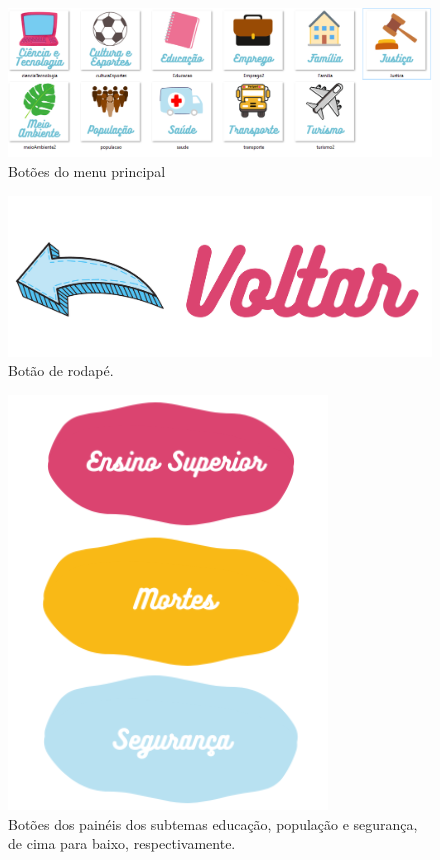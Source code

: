 \documentclass[
]{book}
\begin{document}
\begin{figure}
\includegraphics[width=1.5\linewidth]{images/image80} \caption{Botões do menu principal}\label{fig:botaotrecossa}
\end{figure}

\begin{figure}
\includegraphics[width=0.5\linewidth]{images/image69} \caption{Botão de rodapé.}\label{fig:voltartrecossa}
\end{figure}

\begin{figure}
\includegraphics[width=0.5\linewidth]{images/image27} \caption{Botões dos painéis dos subtemas educação, população e segurança, de cima para baixo, respectivamente.}\label{fig:botaointtrecossa}
\end{figure}
\end{document}
